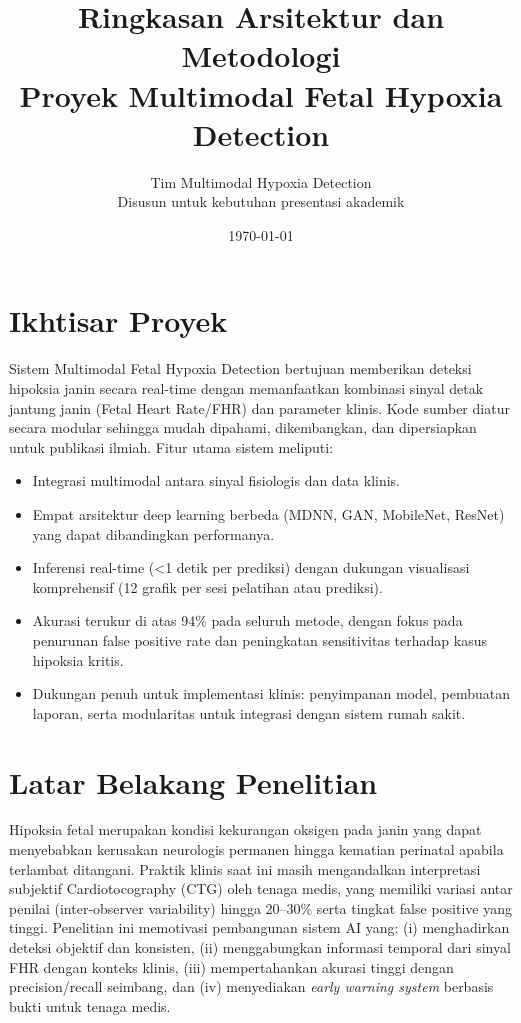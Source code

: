 \documentclass[11pt,a4paper]{article}
\title{Ringkasan Arsitektur dan Metodologi \\Proyek Multimodal Fetal Hypoxia Detection}
\author{Tim Multimodal Hypoxia Detection\\Disusun untuk kebutuhan presentasi akademik}
\date{\today}
\begin{document}
\maketitle

\section{Ikhtisar Proyek}
Sistem Multimodal Fetal Hypoxia Detection bertujuan memberikan deteksi hipoksia janin secara real-time dengan memanfaatkan kombinasi sinyal detak jantung janin (Fetal Heart Rate/FHR) dan parameter klinis. Kode sumber diatur secara modular sehingga mudah dipahami, dikembangkan, dan dipersiapkan untuk publikasi ilmiah. Fitur utama sistem meliputi:
\begin{itemize}[leftmargin=*]
    \item Integrasi multimodal antara sinyal fisiologis dan data klinis.
    \item Empat arsitektur deep learning berbeda (MDNN, GAN, MobileNet, ResNet) yang dapat dibandingkan performanya.
    \item Inferensi real-time (\textless{}1 detik per prediksi) dengan dukungan visualisasi komprehensif (12 grafik per sesi pelatihan atau prediksi).
    \item Akurasi terukur di atas 94\% pada seluruh metode, dengan fokus pada penurunan false positive rate dan peningkatan sensitivitas terhadap kasus hipoksia kritis.
    \item Dukungan penuh untuk implementasi klinis: penyimpanan model, pembuatan laporan, serta modularitas untuk integrasi dengan sistem rumah sakit.
\end{itemize}

\section{Latar Belakang Penelitian}
Hipoksia fetal merupakan kondisi kekurangan oksigen pada janin yang dapat menyebabkan kerusakan neurologis permanen hingga kematian perinatal apabila terlambat ditangani. Praktik klinis saat ini masih mengandalkan interpretasi subjektif Cardiotocography (CTG) oleh tenaga medis, yang memiliki variasi antar penilai (inter-observer variability) hingga 20--30\% serta tingkat false positive yang tinggi. Penelitian ini memotivasi pembangunan sistem AI yang: (i) menghadirkan deteksi objektif dan konsisten, (ii) menggabungkan informasi temporal dari sinyal FHR dengan konteks klinis, (iii) mempertahankan akurasi tinggi dengan precision/recall seimbang, dan (iv) menyediakan \textit{early warning system} berbasis bukti untuk tenaga medis.
\end{document}
